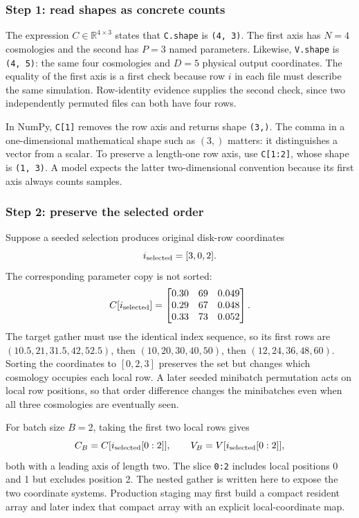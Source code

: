 \documentclass[10pt,aps,prd,twocolumn,nofootinbib]{revtex4-2}
\newcommand{\code}[1]{\texttt{#1}}
\begin{document}
\subsubsection{Step 1: read shapes as concrete counts}

The expression $C\in\mathbb{R}^{4\times3}$ states that \code{C.shape} is
\code{(4, 3)}.  The first axis has $N=4$ cosmologies and the second has
$P=3$ named parameters.  Likewise, \code{V.shape} is \code{(4, 5)}:
the same four cosmologies and $D=5$ physical output coordinates.  The
equality of the first axis is a first check because row $i$ in each file must
describe the same simulation.  Row-identity evidence supplies the second
check, since two independently permuted files can both have four rows.

In NumPy, \code{C[1]} removes the row axis and returns shape \code{(3,)}.
The comma in a one-dimensional mathematical shape such as $(3,)$ matters:
it distinguishes a vector from a scalar.  To preserve a length-one row axis,
use \code{C[1:2]}, whose shape is \code{(1, 3)}.  A model expects the latter
two-dimensional convention because its first axis always counts samples.

\subsubsection{Step 2: preserve the selected order}

Suppose a seeded selection produces original disk-row coordinates
\begin{equation*}
  i_{\rm selected}=[3,0,2].
\end{equation*}
The corresponding parameter copy is not sorted:
\begin{equation*}
 C[i_{\rm selected}]=
 \begin{bmatrix}
 0.30&69&0.049\\
 0.29&67&0.048\\
 0.33&73&0.052
 \end{bmatrix}.
\end{equation*}
The target gather must use the identical index sequence, so its first rows are
$(10.5,21,31.5,42,52.5)$, then
$(10,20,30,40,50)$, then
$(12,24,36,48,60)$.  Sorting the coordinates to $[0,2,3]$ preserves the
set but changes which cosmology occupies each local row.  A later seeded
minibatch permutation acts on local row positions, so that order difference
changes the minibatches even when all three cosmologies are eventually seen.

For batch size $B=2$, taking the first two local rows gives
\begin{equation*}
 C_B=C[i_{\rm selected}[0:2]],\qquad
 V_B=V[i_{\rm selected}[0:2]],
\end{equation*}
both with a leading axis of length two.  The slice \code{0:2} includes local
positions 0 and 1 but excludes position 2.  The nested gather is written here
to expose the two coordinate systems.  Production staging may first build a
compact resident array and later index that compact array with an explicit
local-coordinate map.
\end{document}
